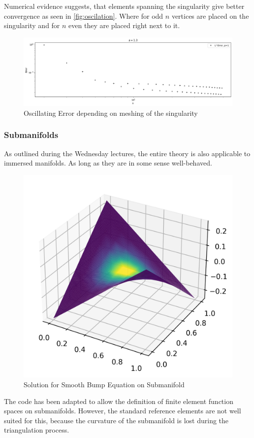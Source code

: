 \documentclass[11pt,a4paper]{article}
\begin{document}
\begin{multicols}{2}
Numerical evidence suggests, that elements spanning the singularity give better convergence as seen in
\autoref{fig:oscilation}. Where for odd $n$ vertices are placed on the singularity and for $n$ even they are placed right next to it.
\begin{figure}[H]
  \centering
  \includegraphics[width=1\linewidth]{oscilation}
  \caption{Oscillating Error depending on meshing of the singularity}
  \label{fig:oscilation}
\end{figure}


\subsubsection*{Submanifolds}
As outlined during the Wednesday lectures, the entire theory is also applicable to immersed manifolds.
As long as they are in some sense well-behaved.
\begin{figure}
  \begin{center}
    \includegraphics[width=1\linewidth]{submanifold}
    \caption{Solution for Smooth Bump Equation on Submanifold}
  \end{center}
\end{figure}
The code has been adapted to allow the definition of finite element function spaces on submanifolds.
However, the standard reference elements are not well suited for this, because the curvature of the
submanifold is lost during the triangulation process.


\end{multicols}
\end{document}
